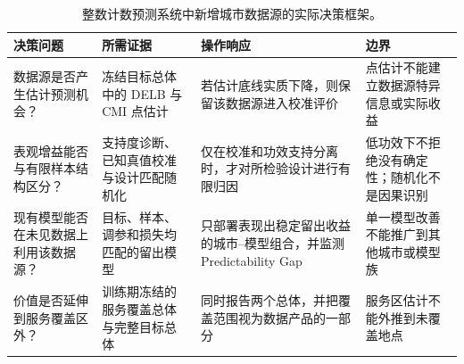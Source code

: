 \begin{table}[!htbp]
\caption{整数计数预测系统中新增城市数据源的实际决策框架。}
\label{tab:practical_decision_framework}
\centering
\footnotesize
\begin{tabularx}{\textwidth}{p{2.8cm}XXp{3.2cm}}
\toprule
\textbf{决策问题} & \textbf{所需证据} &
\textbf{操作响应} & \textbf{边界}\\
\midrule
数据源是否产生估计预测机会？ &
冻结目标总体中的 DELB 与 CMI 点估计 &
若估计底线实质下降，则保留该数据源进入校准评价 &
点估计不能建立数据源特异信息或实际收益\\
表观增益能否与有限样本结构区分？ &
支持度诊断、已知真值校准与设计匹配随机化 &
仅在校准和功效支持分离时，才对所检验设计进行有限归因 &
低功效下不拒绝没有确定性；随机化不是因果识别\\
现有模型能否在未见数据上利用该数据源？ &
目标、样本、调参和损失均匹配的留出模型 &
只部署表现出稳定留出收益的城市--模型组合，并监测 Predictability Gap &
单一模型改善不能推广到其他城市或模型族\\
价值是否延伸到服务覆盖区外？ &
训练期冻结的服务覆盖总体与完整目标总体 &
同时报告两个总体，并把覆盖范围视为数据产品的一部分 &
服务区估计不能外推到未覆盖地点\\
\bottomrule
\end{tabularx}
\end{table}
